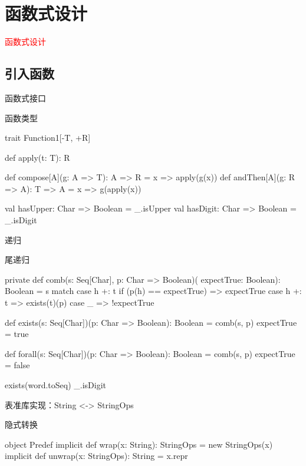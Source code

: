 \section{函数式设计}
\label{sec:fpdesign}

\begin{frame}
  \begin{center}
    \Huge{\textcolor{red}{函数式设计}}
  \end{center}
\end{frame}

\subsection{引入函数}

\begin{frame}[fragile]{函数式接口}
 \begin{block}{函数类型}
  \begin{scala}
trait Function1[-T, +R] {
  def apply(t: T): R

  def compose[A](g: A => T): A => R = x => apply(g(x))
  def andThen[A](g: R => A): T => A = x => g(apply(x)) 
}

val hasUpper: Char => Boolean = _.isUpper
val hasDigit: Char => Boolean = _.isDigit
  \end{scala}
 \end{block}
\end{frame}

\begin{frame}[fragile]{递归}
 \begin{block}{尾递归}
  \begin{scala}
private def comb(s: Seq[Char], p: Char => Boolean)(
  expectTrue: Boolean): Boolean = s match {
    case h +: t if (p(h) == expectTrue) => expectTrue
    case h +: t => exists(t)(p)
    case _ => !expectTrue
  }

def exists(s: Seq[Char])(p: Char => Boolean): Boolean = 
  comb(s, p) { expectTrue = true }

def forall(s: Seq[Char])(p: Char => Boolean): Boolean = 
  comb(s, p) { expectTrue = false }

exists(word.toSeq) { _.isDigit }
  \end{scala}
 \end{block}
\end{frame}

\begin{frame}[fragile]{表准库实现：String <-> StringOps}
 \begin{block}{隐式转换}
  \begin{scala}
object Predef {
  implicit def wrap(x: String): StringOps = new StringOps(x)
  implicit def unwrap(x: StringOps): String = x.repr
}
  \end{scala}
 \end{block}
\end{frame}

